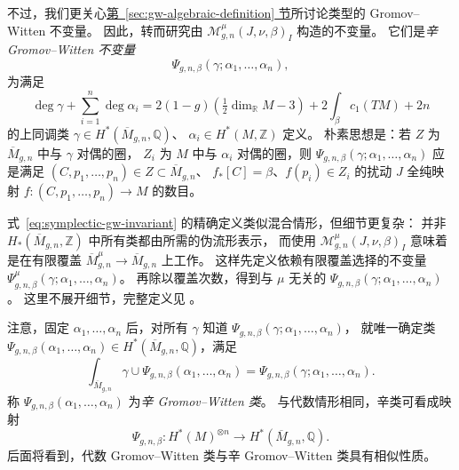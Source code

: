 不过，我们更关心\hyperref[sec:gw-algebraic-definition]{第~\ref*{sec:gw-algebraic-definition} 节}所讨论类型的 Gromov--Witten 不变量。
因此，转而研究由 $\mathcal M^\mu_{g,n}(J,\nu,\beta)_I$ 构造的不变量。
它们是\emph{辛 Gromov--Witten 不变量}
\begin{equation}\label{eq:symplectic-gw-invariant}
\Psi_{g,n,\beta}(\gamma;\alpha_1,\ldots,\alpha_n),
\end{equation}
为满足
\[
\deg\gamma+\sum_{i=1}^n\deg\alpha_i
=2(1-g)\left(\tfrac12\dim_{\mathbb R}M-3\right)
+2\int_\beta c_1(TM)+2n
\]
的上同调类 $\gamma\in H^*(\overline M_{g,n},\mathbb Q)$、
$\alpha_i\in H^*(M,\mathbb Z)$ 定义。
朴素思想是：若 $Z$ 为 $\overline M_{g,n}$ 中与 $\gamma$ 对偶的圈，
$Z_i$ 为 $M$ 中与 $\alpha_i$ 对偶的圈，则
$\Psi_{g,n,\beta}(\gamma;\alpha_1,\ldots,\alpha_n)$ 应是满足
$(C,p_1,\ldots,p_n)\in Z\subset\overline M_{g,n}$、
$f_*[C]=\beta$、$f(p_i)\in Z_i$ 的扰动 $J$ 全纯映射
$f:(C,p_1,\ldots,p_n)\to M$ 的数目。

式~\eqref{eq:symplectic-gw-invariant} 的精确定义类似混合情形，但细节更复杂：
并非 $H_*(\overline M_{g,n},\mathbb Z)$ 中所有类都由所需的伪流形表示，
而使用 $\mathcal M^\mu_{g,n}(J,\nu,\beta)_I$ 意味着是在有限覆盖
$\overline M^\mu_{g,n}\to\overline M_{g,n}$ 上工作。
这样先定义依赖有限覆盖选择的不变量
$\Psi^\mu_{g,n,\beta}(\gamma;\alpha_1,\ldots,\alpha_n)$。
再除以覆盖次数，得到与 $\mu$ 无关的
$\Psi_{g,n,\beta}(\gamma;\alpha_1,\ldots,\alpha_n)$。
这里不展开细节，完整定义见 。

注意，固定 $\alpha_1,\ldots,\alpha_n$ 后，对所有 $\gamma$ 知道
$\Psi_{g,n,\beta}(\gamma;\alpha_1,\ldots,\alpha_n)$，
就唯一确定类
$\Psi_{g,n,\beta}(\alpha_1,\ldots,\alpha_n)\in H^*(\overline M_{g,n},\mathbb Q)$，满足
\[
\int_{\overline M_{g,n}}\gamma\cup
\Psi_{g,n,\beta}(\alpha_1,\ldots,\alpha_n)
=\Psi_{g,n,\beta}(\gamma;\alpha_1,\ldots,\alpha_n).
\]
称 $\Psi_{g,n,\beta}(\alpha_1,\ldots,\alpha_n)$ 为\emph{辛 Gromov--Witten 类}。
与代数情形相同，辛类可看成映射
\begin{equation}\label{eq:symplectic-gw-class-map}
\Psi_{g,n,\beta}:H^*(M)^{\otimes n}\longrightarrow H^*(\overline M_{g,n},\mathbb Q).
\end{equation}
后面将看到，代数 Gromov--Witten 类与辛 Gromov--Witten 类具有相似性质。

